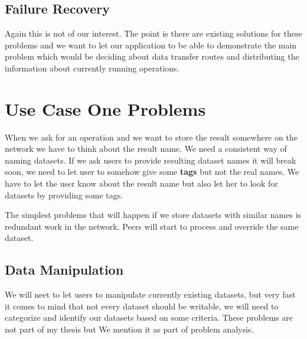 \subsection{Failure Recovery}
Again this is not of our interest. The point is there are existing solutions for these problems and we want to let our application to be able to demonstrate the main problem which would be deciding about data transfer routes and distributing the information about currently running operations.

\section{Use Case One Problems}
When we ask for an operation and we want to store the result somewhere on the network we have to think about the result name. 
We need a consistent way of naming datasets. If we ask users to provide resulting dataset names it will break soon, we need to 
let user to somehow give some \textbf{tags} but not the real names. We have to let the user know about the result name but also
let her to look for datasets by providing some tags.

The simplest problems that will happen if we store datasets with similar names is redundant work in the network. Peers will start 
to process and override the same dataset.

\subsection{Data Manipulation}
We will neet to let users to manipulate currently existing datasets, but very fast it comes to mind that not every dataset should be
writable, we will need to categorize and identify our datasets based on some criteria. These problems are not part of my thesis but
We mention it as part of problem analysis.


